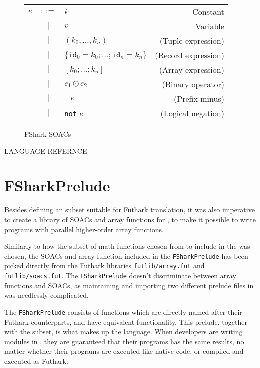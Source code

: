 \begin{figure}
  \centering
  \begin{tabular}{lclr}
    $e$ & $::=$ & $k$ & Constant \\
        & $|$   & $v$ & Variable \\
        & $|$   & $(k_0 , \ldots , k_n)$ & (Tuple expression) \\
        & $|$   & $\{\texttt{id}_0=k_0 ; \ldots ; \texttt{id}_n=k_n\}$ & (Record expression) \\
        & $|$   & $[k_0 ; \ldots ; k_n]$ & (Array expression) \\
        & $|$   & $e_1 \odot e_2$ & (Binary operator) \\
        & $|$   & $-e$ & (Prefix minus) \\
        & $|$   & \texttt{not} $e$ & (Logical negation) \\
  \end{tabular}
  \caption{FShark SOACs}
\end{figure}

LANGUAGE REFERNCE


\chapter{FSharkPrelude}
Besides defining an \fsharp{} subset suitable for Futhark translation, it was
also imperative to create a library of SOACs and array functions for \fshark{},
to make it possible to write programs with parallel higher-order array
functions.

Similarly to how the subset of math functions chosen from \fsharp{} to include in
the \fshark{} was chosen, the SOACs and array function included in the
\texttt{FSharkPrelude} has been picked directly from the Futhark libraries
\texttt{futlib/array.fut} and \texttt{futlib/soacs.fut}. The \texttt{FSharkPrelude} doesn't
discriminate between array functions and SOACs, as maintaining and importing two
different prelude files in \fshark{} was needlessly complicated.

The \texttt{FSharkPrelude} consists of functions which are directly named after
their Futhark counterparts, and have equivalent functionality.
This prelude, together with the \fshark{} subset, is what makes up the \fshark{} language.
When \fshark{} developers are writing modules in \fshark{}, they are guaranteed
that their \fshark{} programs has the same results, no matter whether their
programs are executed like native \fsharp{} code, or compiled and executed as
Futhark.


